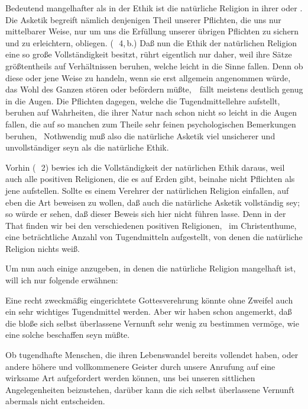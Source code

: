 \begin{aufza}
\item Bedeutend mangelhafter als in der Ethik ist die natürliche Religion in ihrer  oder . Die Asketik begreift nämlich denjenigen Theil unserer Pflichten, die uns nur mittelbarer Weise, nur um uns die Erfüllung unserer übrigen Pflichten zu sichern und zu erleichtern, obliegen. (\ \no\,4,\,b.) Daß nun die Ethik der natürlichen Religion eine so große Vollständigkeit besitzt, rührt eigentlich nur daher, weil ihre Sätze größtentheils auf Verhältnissen beruhen, welche leicht in die Sinne fallen. Denn ob diese oder jene Weise zu handeln, wenn sie erst allgemein angenommen würde, das Wohl des Ganzen stören oder befördern müßte,~\ fällt meistens deutlich genug in die Augen. Die Pflichten dagegen, welche die Tugendmittellehre aufstellt, beruhen auf Wahrheiten, die ihrer Natur nach schon nicht so leicht in die Augen fallen, die auf so manchen zum Theile sehr feinen psychologischen Bemerkungen beruhen, \udgl\ Nothwendig muß also die natürliche Asketik viel unsicherer und unvollständiger seyn als die natürliche Ethik.
\begin{RWanm}
Vorhin (\ \no\,2) bewies ich die Vollständigkeit der natürlichen Ethik daraus, weil auch alle positiven Religionen, die es auf Erden gibt, beinahe nicht  Pflichten als jene aufstellen. Sollte es einem Verehrer der natürlichen Religion einfallen, auf eben die Art beweisen zu wollen, daß auch die natürliche Asketik vollständig sey; so würde er sehen, daß dieser Beweis sich hier nicht führen lasse. Denn in der That finden wir bei den verschiedenen positiven Religionen, \zB\ im Christenthume, eine beträchtliche Anzahl von Tugendmitteln aufgestellt, von denen die natürliche Religion nichts weiß. 
\end{RWanm}
\item Um nun auch einige  anzugeben, in denen die natürliche Religion mangelhaft ist, will ich nur folgende erwähnen:
\begin{aufzb}
\item Eine recht zweckmäßig eingerichtete Gottesverehrung könnte ohne Zweifel auch ein sehr wichtiges Tugendmittel werden. Aber wir haben schon angemerkt, daß die bloße sich selbst überlassene Vernunft sehr wenig zu bestimmen vermöge, wie eine solche beschaffen seyn müßte.
\item Ob tugendhafte Menschen, die ihren Lebenswandel bereits vollendet haben, oder andere höhere und vollkommenere Geister durch unsere Anrufung auf eine wirksame Art aufgefordert werden können, uns bei unseren sittlichen Angelegenheiten beizustehen, darüber kann die sich selbst überlassene Vernunft abermals nicht entscheiden.

\end{aufzb}
\end{aufza}

